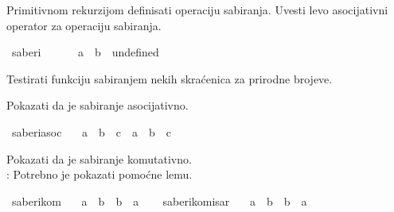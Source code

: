 \begin{isabellebody}
\begin{exercise}[subtitle=Zasnivanje prirodnih brojeva.]
\begin{isamarkuptext}%
Primitivnom rekurzijom definisati operaciju sabiranja. Uvesti levo 
      asocijativni operator \isa{{\isasymoplus}} za operaciju sabiranja.%
\end{isamarkuptext}\isamarkuptrue%
\isamarkupfalse%
\ saberi\ {\isacharparenleft}{\kern0pt}\ {\isachardoublequoteopen}{\isasymoplus}{\isachardoublequoteclose}\ {}{}{}{\isacharparenright}{\kern0pt}\ \isanewline
\ \ {\isachardoublequoteopen}a\ {\isasymoplus}\ b\ {\isacharequal}{\kern0pt}\ undefined{\isachardoublequoteclose}%
\begin{isamarkuptext}%
Testirati funkciju sabiranjem nekih skraćenica za prirodne brojeve.%
\end{isamarkuptext}\isamarkuptrue%
%
\begin{isamarkuptext}%
Pokazati da je sabiranje asocijativno.%
\end{isamarkuptext}\isamarkuptrue%
\isamarkupfalse%
\ saberi{\isacharunderscore}{\kern0pt}asoc{\isacharcolon}{\kern0pt}\isanewline
\ \ \ {\isachardoublequoteopen}a\ {\isasymoplus}\ {\isacharparenleft}{\kern0pt}b\ {\isasymoplus}\ c{\isacharparenright}{\kern0pt}\ {\isacharequal}{\kern0pt}\ a\ {\isasymoplus}\ b\ {\isasymoplus}\ c{\isachardoublequoteclose}\isanewline
\ \ %
\isadelimproof
%
\endisadelimproof
%
\isatagproof
%
\endisatagproof
{\isafoldproof}%
%
\isadelimproof
%
\endisadelimproof
%
\begin{isamarkuptext}%
Pokazati da je sabiranje komutativno.\\
     : Potrebno je pokazati pomoćne lemu.%
\end{isamarkuptext}\isamarkuptrue%
\isamarkupfalse%
\ saberi{\isacharunderscore}{\kern0pt}kom{\isacharcolon}{\kern0pt}\isanewline
\ \ \ {\isachardoublequoteopen}a\ {\isasymoplus}\ b\ {\isacharequal}{\kern0pt}\ b\ {\isasymoplus}\ a{\isachardoublequoteclose}\isanewline
\ \ %
\isadelimproof
%
\endisadelimproof
%
\isatagproof
%
\endisatagproof
{\isafoldproof}%
%
\isadelimproof
%
\endisadelimproof
\isanewline
{}\isamarkupfalse%
\ saberi{\isacharunderscore}{\kern0pt}kom{\isacharunderscore}{\kern0pt}isar{\isacharcolon}{\kern0pt}\isanewline
\ \ \ {\isachardoublequoteopen}a\ {\isasymoplus}\ b\ {\isacharequal}{\kern0pt}\ b\ {\isasymoplus}\ a{\isachardoublequoteclose}\isanewline
\ \ %
\isadelimproof
%
\endisadelimproof
%
\isatagproof
%
\endisatagproof

\end{exercise}
\end{isabellebody}
